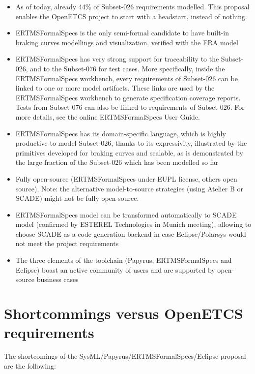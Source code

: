 \begin{itemize}
	\item As of today, already 44\% of Subset-026 requirements modelled. This proposal enables the OpenETCS project to start with a headstart, instead of nothing.
	\item ERTMSFormalSpecs is the only semi-formal candidate to have built-in braking curves modellings and visualization, verified with the ERA model
	\item ERTMSFormalSpecs has very strong support for traceability to the Subset-026, and to the Subset-076 for test cases. More specifically, inside the ERTMSFormalSpecs workbench, every requirements of Subset-026 can be linked to one or more model artifacts. These links are used by the ERTMSFormalSpecs workbench to generate specification coverage reports. Tests from Subset-076 can also be linked to requirements of Subset-026. For more details, see the online ERTMSFormalSpecs User Guide.  
	\item ERTMSFormalSpecs has its domain-specific language, which is highly productive to model Subset-026, thanks to its expressivity, illustrated by the primitives
developed for braking curves and scalable, as is demonstrated by the large fraction of the Subset-026 which has been modelled so far
	\item Fully open-source (ERTMSFormalSpecs under EUPL license, others open source). Note: the alternative model-to-source strategies (using Atelier B or SCADE)  might not be fully open-source. 
	\item ERTMSFormalSpecs model can be transformed automatically to SCADE model (confirmed by ESTEREL Technologies in Munich meeting), allowing to choose SCADE as a code generation backend in case Eclipse/Polarsys would not meet the project requirements
	\item The three elements of the toolchain (Papyrus, ERTMSFormalSpecs and Eclipse) boast an active community of users and are supported by open-source business cases
\end{itemize}

\section{Shortcommings versus OpenETCS requirements}

The shortcomings of the SysML/Papyrus/ERTMSFormalSpecs/Eclipse proposal are the following:

